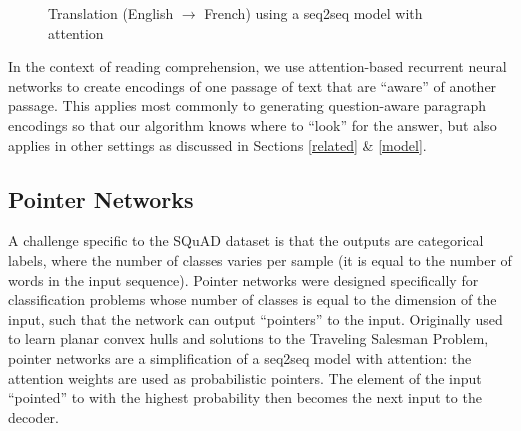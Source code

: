 \documentclass{article}
\begin{document}
\begin{figure}[h]
	\centering
	\qquad
	\caption{Translation (English $\rightarrow$ French) using a seq2seq model with attention}
	\label{fig:attention}
\end{figure}

In the context of reading comprehension, we use attention-based recurrent neural networks to create encodings of one passage of text that are ``aware'' of another passage. This applies most commonly to generating question-aware paragraph encodings so that our algorithm knows where to ``look'' for the answer, but also applies in other settings as discussed in Sections \ref{related} \& \ref{model}.

\subsection{Pointer Networks}
A challenge specific to the SQuAD dataset is that the outputs are categorical labels, where the number of classes varies per sample (it is equal to the number of words in the input sequence). Pointer networks \cite{Ptr-Net} were designed specifically for classification problems whose number of classes is equal to the dimension of the input, such that the network can output ``pointers'' to the input. Originally used to learn planar convex hulls and solutions to the Traveling Salesman Problem, pointer networks are a simplification of a seq2seq model with attention: the attention weights are used as probabilistic pointers. The element of the input ``pointed'' to with the highest probability then becomes the next input to the decoder. 
\end{document}
